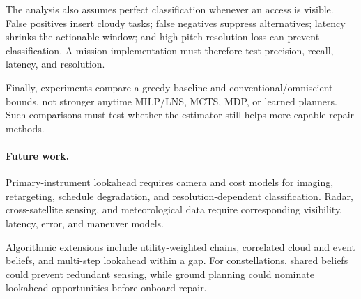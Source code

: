 The analysis also assumes perfect classification whenever an access is visible. False positives insert cloudy tasks; false negatives suppress alternatives; latency shrinks the actionable window; and high-pitch resolution loss can prevent classification. A mission implementation must therefore test precision, recall, latency, and resolution.

Finally, experiments compare a greedy baseline and conventional/omniscient bounds, not stronger anytime MILP/LNS, MCTS, MDP, or learned planners. Such comparisons must test whether the estimator still helps more capable repair methods.

\paragraph{Future work.}
Primary-instrument lookahead requires camera and cost models for imaging, retargeting, schedule degradation, and resolution-dependent classification. Radar, cross-satellite sensing, and meteorological data require corresponding visibility, latency, error, and maneuver models.

Algorithmic extensions include utility-weighted chains, correlated cloud and event beliefs, and multi-step lookahead within a gap. For constellations, shared beliefs could prevent redundant sensing, while ground planning could nominate lookahead opportunities before onboard repair.
